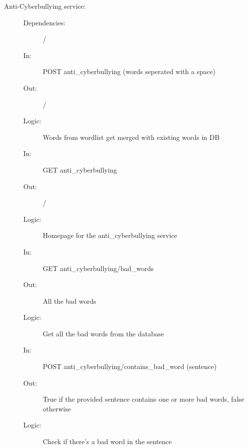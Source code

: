 \documentclass{article}
\begin{document}
\begin{description}
    \item [Anti-Cyberbullying service:]
    \begin{description}
        \item[]
        \item[Dependencies:] /
    \end{description}
    \begin{description}
        \item[]
        \item[In:] POST anti\_cyberbullying (words seperated with a space)
        \item[Out:] /
        \item[Logic:] Words from wordlist get merged with existing words in DB
        \item[]

        \item[In:] GET anti\_cyberbullying
        \item[Out:] /
        \item[Logic:] Homepage for the anti\_cyberbullying service
        \item[]

        \item[In:] GET anti\_cyberbullying/bad\_words
        \item[Out:] All the bad words
        \item[Logic:] Get all the bad words from the database
        \item[]

        \item[In:] POST anti\_cyberbullying/contains\_bad\_word (sentence)
        \item[Out:] True if the provided sentence contains one or more bad words, false otherwise
        \item[Logic:] Check if there's a bad word in the sentence
    \end{description}
\end{description}
\end{document}
